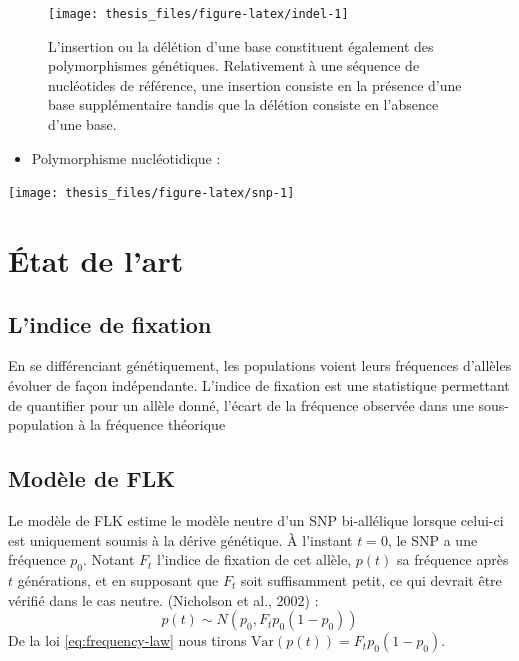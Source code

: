\documentclass[12pt,a4paper,twoside]{ugathesis}
\providecommand{\tightlist}{%
  \setlength{\itemsep}{0pt}\setlength{\parskip}{0pt}}
\theoremstyle{definition}
\theoremstyle{definition}
\theoremstyle{remark}
\begin{document}
\begin{figure}

{\centering \texttt{[image: thesis\_files/figure-latex/indel-1]} 

}

\caption{L'insertion ou la délétion d'une base constituent
également des polymorphismes génétiques. Relativement à une séquence de
nucléotides de référence, une insertion consiste en la présence d'une
base supplémentaire tandis que la délétion consiste en l'absence d'une
base.}\label{fig:indel}
\end{figure}
\begin{itemize}
\tightlist
\item
  Polymorphisme nucléotidique :
\end{itemize}
\begin{center}\texttt{[image: thesis\_files/figure-latex/snp-1]} \end{center}

\chapter{État de l'art}\label{etat-de-lart}

\section{L'indice de fixation}\label{lindice-de-fixation}

En se différenciant génétiquement, les populations voient leurs
fréquences d'allèles évoluer de façon indépendante. L'indice de fixation
est une statistique permettant de quantifier pour un allèle donné,
l'écart de la fréquence observée dans une sous-population à la fréquence
théorique

\section{Modèle de FLK}\label{modele-de-flk}

Le modèle de FLK estime le modèle neutre d'un SNP bi-allélique lorsque
celui-ci est uniquement soumis à la dérive génétique. À l'instant
\(t = 0\), le SNP a une fréquence \(p_0\). Notant \(F_t\) l'indice de
fixation de cet allèle, \(p(t)\) sa fréquence après \(t\) générations,
et en supposant que \(F_t\) soit suffisamment petit, ce qui devrait être
vérifié dans le cas neutre. (Nicholson et al., 2002) :
\begin{equation} 
  p(t) \sim N(p_0, F_t p_0 (1-p_0)) 
  \label{eq:frequency-law}
\end{equation}
De la loi \eqref{eq:frequency-law} nous tirons
\(\text{Var}(p(t)) = F_t p_0 (1-p_0)\).
\end{document}
